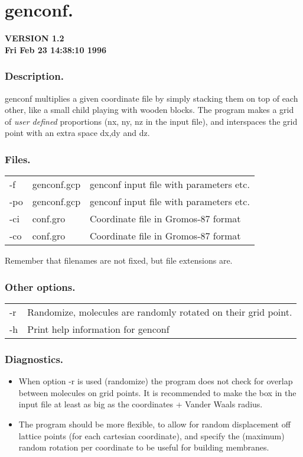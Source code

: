 \newpage
\section{genconf.}
{\bf VERSION 1.2\\Fri Feb 23 14:38:10 1996
}

\subsubsection*{Description.}
genconf multiplies a given coordinate file by simply stacking them
on top of each other, like a small child playing with wooden blocks.
The program makes a grid of {\em user defined}
proportions (nx, ny, nz in the input file), 
and interspaces the grid point with an extra space dx,dy and dz.
\subsubsection*{Files.}
\begin{table}[ht]
\begin{tabularx}{\linewidth}{llX}
-f & genconf.gcp & genconf input file with parameters etc. \\
-po & genconf.gcp & genconf input file with parameters etc. \\
-ci & conf.gro & Coordinate file in Gromos-87 format \\
-co & conf.gro & Coordinate file in Gromos-87 format \\
\end{tabularx}
\end{table}
Remember that filenames are not fixed, but 
file extensions are.
\subsubsection*{Other options.}
\begin{table}[ht]
\begin{tabularx}{\linewidth}{lX}
-r & Randomize, molecules are randomly rotated on their grid point.\\
-h & Print help information for genconf\\
\end{tabularx}
\end{table}
\subsubsection*{Diagnostics.}
\begin{itemize}
\item	When option -r is used (randomize) the program does not check for overlap between molecules on grid points. It is recommended to make the box in the input file at least as big as the coordinates + Vander Waals radius. 
\item	The program should be more flexible, to allow for random displacement off lattice points (for each cartesian coordinate), and specify the (maximum) random rotation per coordinate to be useful for building membranes.
\end{itemize}
